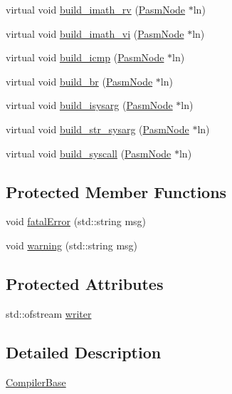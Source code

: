 \begin{DoxyCompactItemize}
virtual void \hyperlink{classCompilerBase_a4523dc15837880ad2ab1a227a1ed2e06}{build\+\_\+imath\+\_\+rv} (\hyperlink{classPASM_1_1PasmNode}{Pasm\+Node} $\ast$ln)
\item 
virtual void \hyperlink{classCompilerBase_a2cdb2c74057643900cf1ac3c14d128e6}{build\+\_\+imath\+\_\+vi} (\hyperlink{classPASM_1_1PasmNode}{Pasm\+Node} $\ast$ln)
\item 
virtual void \hyperlink{classCompilerBase_a8d475131561c7058af580787e0170361}{build\+\_\+icmp} (\hyperlink{classPASM_1_1PasmNode}{Pasm\+Node} $\ast$ln)
\item 
virtual void \hyperlink{classCompilerBase_a033c2be4ef91aaf7ac09e480440d1cd2}{build\+\_\+br} (\hyperlink{classPASM_1_1PasmNode}{Pasm\+Node} $\ast$ln)
\item 
virtual void \hyperlink{classCompilerBase_a6658db1533602d1c079d0590fb34e8d4}{build\+\_\+isysarg} (\hyperlink{classPASM_1_1PasmNode}{Pasm\+Node} $\ast$ln)
\item 
virtual void \hyperlink{classCompilerBase_ac48bd566e22943c58bcd743eca8ee262}{build\+\_\+str\+\_\+sysarg} (\hyperlink{classPASM_1_1PasmNode}{Pasm\+Node} $\ast$ln)
\item 
virtual void \hyperlink{classCompilerBase_aa1eabf171523a3ed3b011dde48ec2fd7}{build\+\_\+syscall} (\hyperlink{classPASM_1_1PasmNode}{Pasm\+Node} $\ast$ln)
\end{DoxyCompactItemize}
\subsection*{Protected Member Functions}
\begin{DoxyCompactItemize}
\item 
void \hyperlink{classCompilerBase_adb63718f4b3bc51bc717b229d3c0151f}{fatal\+Error} (std\+::string msg)
\item 
void \hyperlink{classCompilerBase_a5071a080216879535460939393c59282}{warning} (std\+::string msg)
\end{DoxyCompactItemize}
\subsection*{Protected Attributes}
\begin{DoxyCompactItemize}
\item 
std\+::ofstream \hyperlink{classCompilerBase_a27c46d3aaf3505d4efa2183f05b906bb}{writer}
\end{DoxyCompactItemize}


\subsection{Detailed Description}
\hyperlink{classCompilerBase}{Compiler\+Base}

